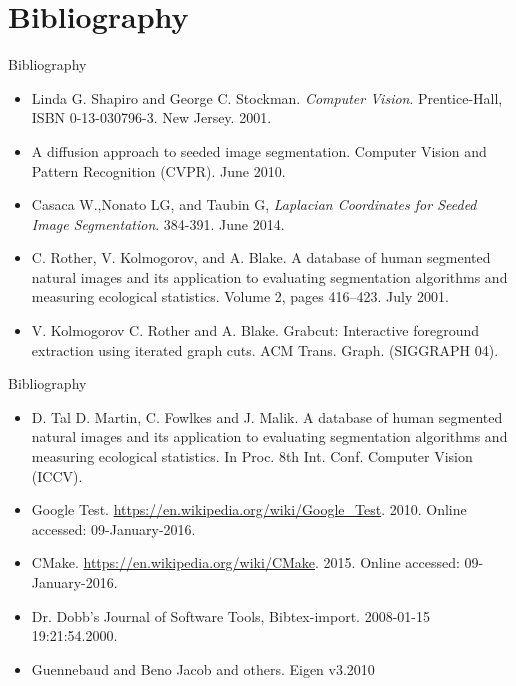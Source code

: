 \documentclass[10pt]{beamer}
\begin{document}
\section{Bibliography}
\begin{frame}{Bibliography}
	\begin{itemize}
    \item Linda G. Shapiro and George C. Stockman. \textit{Computer Vision}. Prentice-Hall, ISBN 0-13-030796-3. New Jersey. 2001.
    \item A diffusion approach to seeded image segmentation. Computer Vision and Pattern Recognition (CVPR). June 2010.
    \item Casaca W.,Nonato LG, and Taubin G, \textit{Laplacian Coordinates for Seeded Image Segmentation}. 384-391. June 2014.
    \item C. Rother, V. Kolmogorov, and A. Blake. A database of human segmented natural images and its application to evaluating segmentation algorithms and measuring ecological statistics. Volume 2, pages 416–423. July 2001.
    \item V. Kolmogorov C. Rother and A. Blake. Grabcut: Interactive foreground extraction using iterated graph cuts. ACM
Trans. Graph. (SIGGRAPH 04).
    \end{itemize}
  \end{frame}
\begin{frame}{Bibliography}
	\begin{itemize} 
	\item D. Tal D. Martin, C. Fowlkes and J. Malik. A database
of human segmented natural images and its application to evaluating segmentation algorithms and measuring ecological
statistics. In Proc. 8th Int. Conf. Computer Vision (ICCV).
    \item Google Test. \url{https://en.wikipedia.org/wiki/Google_Test}. 2010. Online accessed: 09-January-2016.
    \item CMake. \url{https://en.wikipedia.org/wiki/CMake}. 2015. Online accessed: 09-January-2016.
    \item Dr. Dobb's Journal of Software Tools, Bibtex-import. 2008-01-15 19:21:54.2000.
    \item Guennebaud and Beno Jacob and others. Eigen v3.2010
	\end{itemize}
\end{frame}

{\1
\begin{frame} 
  \titlepage
\end{frame}}
\end{document}

